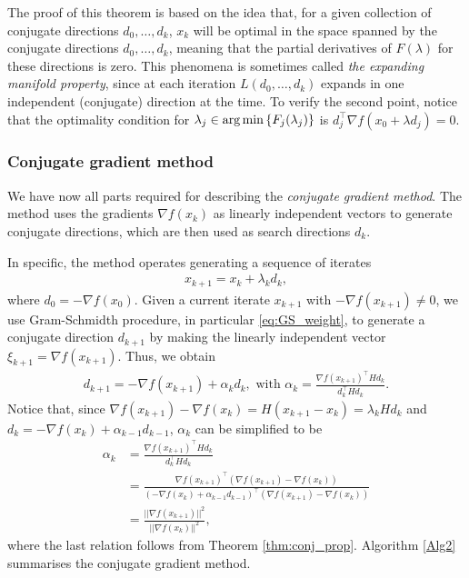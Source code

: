 The proof of this theorem is based on the idea that, for a given collection of conjugate directions $d_0,\dots, d_k$, $x_k$ will be optimal in the space spanned by the conjugate directions $d_0, \dots, d_k$, meaning that the partial derivatives of $F(\lambda)$ for these directions is zero. This phenomena is sometimes called \emph{the expanding manifold property}, since at each iteration $L(d_0,\dots,d_k)$ expands in one independent (conjugate) direction at the time. To verify the second point, notice that the optimality condition for $\lambda_j \in \arg\min \left\{ F_j(\lambda_j) \right \} $ is $d_j^\top\nabla f(x_0 + \lambda d_j) = 0$.

\subsubsection{Conjugate gradient method}

We have now all parts required for describing the \emph{conjugate gradient method}. The method uses the gradients $\nabla f(x_k)$ as linearly independent vectors to generate conjugate directions, which are then used as search directions $d_k$.

In specific, the method operates generating a sequence of iterates
%
\begin{align*}
	x_{k+1} = x_k + \lambda_k d_k,	
\end{align*}
%
where $d_0 = -\nabla f(x_0)$. Given a current iterate $x_{k+1}$ with $-\nabla f (x_{k+1}) \neq 0$, we use Gram-Schmidth procedure, in particular \eqref{eq:GS_weight}, to generate a conjugate direction $d_{k+1}$ by making the linearly independent vector $\xi_{k+1} = \nabla f(x_{k+1})$. Thus, we obtain
%
\begin{align}
d_{k+1} = -\nabla f(x_{k+1}) + \alpha_kd_k, \text{ with } \alpha_k = \frac{\nabla f(x_{k+1})^\top H d_k}{d_k^\top Hd_k}. \label{eq:conj_grad}
\end{align}
%
Notice that, since $\nabla f(x_{k+1}) - \nabla f(x_k) = H(x_{k+1} - x_k) = \lambda_k H d_k$ and  $d_k= - \nabla f(x_k) + \alpha_{k-1}d_{k-1}$, $\alpha_k$ can be simplified to be
%
\begin{align*}
	\alpha_k &= \frac{\nabla f(x_{k+1})^\top H d_k}{d_k^\top Hd_k} \\
	&= \frac{\nabla f(x_{k+1})^\top (\nabla f(x_{k+1}) - \nabla f(x_k))}{(- \nabla f(x_k) + \alpha_{k-1}d_{k-1})^\top (\nabla f(x_{k+1}) - \nabla f(x_k))} \\
	&= \frac{||\nabla f(x_{k+1})||^2}{||\nabla f(x_k)||^2},
\end{align*}
where the last relation follows from Theorem \ref{thm:conj_prop}. Algorithm \ref{Alg2} summarises the conjugate gradient method. %

